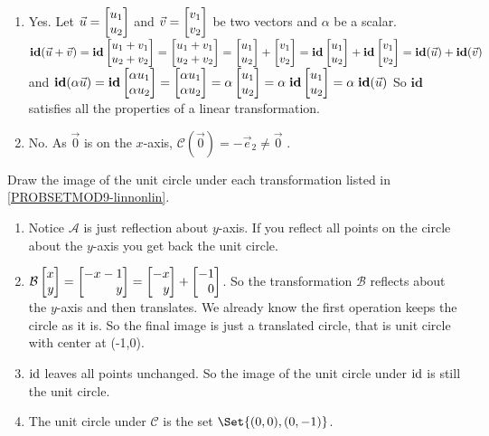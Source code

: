 \begin{exercises}
\begin{problist}
\begin{solution}
\begin{enumerate}
        \item Yes.  Let $\vec{u} = \mat{u_1\\u_2}$ and $\vec{v} = \mat{v_1 \\ v_2}$ be two vectors and $\alpha$ be a scalar.
$\mathbf{id} (\vec{u}+\vec{v}) = \mathbf{id}\mat{u_1 + v_1 \\ u_2 + v_2} = \mat{u_1 + v_1 \\ u_2 + v_2 } = \mat{u_1 \\ u_2 } + \mat{ v_1 \\  v_2 } = \mathbf{id}\mat{u_1\\u_2} + \mathbf{id}\mat{v_1 \\ v_2} = \mathbf{id} (\vec{u}) +\mathbf{id} (\vec{v})$ and
$\mathbf{id}(\alpha \vec{u}) =\mathbf{id}\mat{\alpha u_1 \\ \alpha u_2} = \mat{  \alpha u_1 \\ \alpha u_2} = \alpha \mat{  u_1 \\u_2} = \alpha \; \mathbf{id}\mat{ u_1 \\u_2} = \alpha \; \mathbf{id}(\vec{u}) $
So $\mathbf{id} $ satisfies all the properties of a linear transformation.
        \item No. As $\vec{0}$ is on the $x$-axis, $\mathcal{C}(\vec{0}) = - \vec{e}_2 \neq \vec{0}$ .
		  \end{enumerate}
		\end{solution}

		\prob Draw the image of the unit circle under each transformation listed in \ref{PROBSETMOD9-linnonlin}.
    \begin{solution}
      \begin{enumerate}
        \item Notice $\mathcal A$ is just reflection about $y$-axis. If you reflect all points on the circle about the $y$-axis you get back the unit circle.
				\item $\mathcal{B}\mat{x\\y} = \mat{-x-1\\y} = \mat{-x\\y} + \mat{-1\\0}$. So the transformation $\mathcal{B}$ reflects about the $y$-axis and then translates. We already know the first operation keeps the circle as it is. So the final image is just a translated circle, that is unit circle with center at (-1,0).
				\item $\operatorname{\operatorname{id}}$ leaves all points unchanged. So the image of the unit circle under $\operatorname{\operatorname{id}}$ is still the unit circle.
				\item The unit circle under $\mathcal{C}$ is the set $\Set{(0,0), (0,-1)}$.
      \end{enumerate}
    \end{solution}


\end{problist}
\end{exercises}
